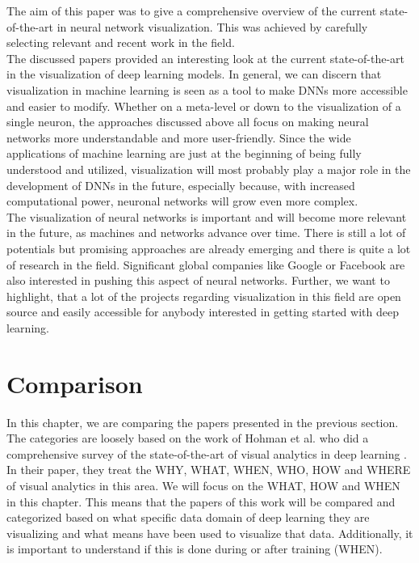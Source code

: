 \documentclass{acmsiggraph}               %
\begin{document}
The aim of this paper was to give a comprehensive overview of the current state-of-the-art in neural network visualization. This was achieved by carefully selecting relevant and recent work in the field.\\

The discussed papers provided an interesting look at the current state-of-the-art in the visualization of deep learning models. In general, we can discern that visualization in machine learning is seen as a tool to make DNNs more accessible and easier to modify. Whether on a meta-level or down to the visualization of a single neuron, the approaches discussed above all focus on making neural networks more understandable and more user-friendly. Since the wide applications of machine learning are just at the beginning of being fully understood and utilized, visualization will most probably play a major role in the development of DNNs in the future, especially because, with increased computational power, neuronal networks will grow even more complex.\\

The visualization of neural networks is important and will become more relevant in the future, as machines and networks advance over time. There is still a lot of potentials but promising approaches are already emerging and there is quite a lot of research in the field. Significant global companies like Google or Facebook are also interested in pushing this aspect of neural networks. Further, we want to highlight, that a lot of the projects regarding visualization in this field are open source and easily accessible for anybody interested in getting started with deep learning. 

\section{Comparison}
In this chapter, we are comparing the papers presented in the previous section. 
The categories are loosely based on the work of Hohman et al. who did a comprehensive survey of the state-of-the-art of visual analytics in deep learning \cite{Hohman2018}.
In their paper, they treat the WHY, WHAT, WHEN, WHO, HOW and WHERE of visual analytics in this area.
We will focus on the WHAT, HOW and WHEN in this chapter. This means that the papers of this work will be compared and categorized based on what specific data domain of deep learning they are visualizing and what means have been used to visualize that data. Additionally, it is important to understand if this is done during or after training (WHEN).
\end{document}
